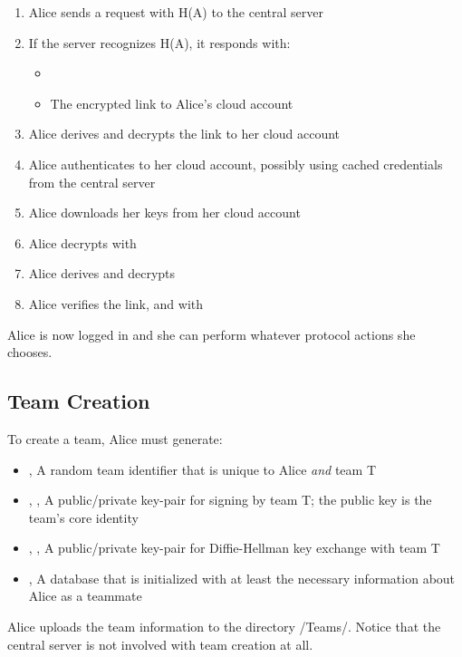 \documentclass[pldi-cameraready,10pt]{sigplanconf-pldi16}
\begin{document}
\begin{enumerate}
\item Alice sends a request with H(A) to the central server
\item If the server recognizes H(A), it responds with:
  \begin{itemize}
  \item {}
  \item The encrypted link to Alice's cloud account
  \end{itemize}
\item Alice derives  and decrypts the link to her cloud account
\item Alice authenticates to her cloud account, possibly using cached credentials from the central server
\item Alice downloads her keys from her cloud account
\item Alice decrypts  with 
\item Alice derives  and decrypts 
\item Alice verifies the link,  and  with 
\end{enumerate}

Alice is now logged in and she can perform whatever protocol actions she chooses.

\subsection{Team Creation}

To create a team, Alice must generate:

\begin{itemize}
\item {}, A random team identifier that is unique to Alice \emph{and} team T
\item {}, , A public/private key-pair for signing by team T; the public key is the team's core identity
\item {}, , A public/private key-pair for Diffie-Hellman key exchange with team T
\item {}, A database that is initialized with at least the necessary information about Alice as a teammate
\end{itemize}

Alice uploads the team information to the directory \slash Teams\slash {}.
Notice that the central server is not involved with team creation at all.
\end{document}
